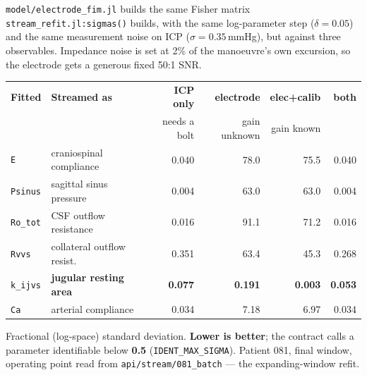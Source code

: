 \documentclass[10pt,a4paper]{article}
\begin{document}
\texttt{model/electrode\_fim.jl} builds the same Fisher matrix
\texttt{stream\_refit.jl:sigmas()} builds, with the same log-parameter step
($\delta=0.05$) and the same measurement noise on ICP ($\sigma=0.35$\,mmHg), but against
three observables. Impedance noise is set at 2\% of the manoeuvre's own excursion, so the
electrode gets a generous fixed 50:1 SNR.

\vspace{2pt}
{\footnotesize
\setlength{\tabcolsep}{5pt}
\renewcommand{\arraystretch}{1.25}
\begin{tabularx}{\linewidth}{@{}l X r r r r@{}}
\toprule
\textbf{\sffamily Fitted} & \textbf{\sffamily Streamed as} &
\textbf{\sffamily ICP only} & \textbf{\sffamily electrode} &
\textbf{\sffamily elec+calib} & \textbf{\sffamily both}\\
& & \scriptsize needs a bolt & \scriptsize gain unknown & \scriptsize gain known & \\
\midrule
\texttt{E}      & craniospinal compliance   & \cellcolor{ok!14}0.040 & \cellcolor{crit!13}78.0 & \cellcolor{crit!13}75.5 & \cellcolor{ok!14}0.040\\
\texttt{Psinus} & sagittal sinus pressure   & \cellcolor{ok!14}0.004 & \cellcolor{crit!13}63.0 & \cellcolor{crit!13}63.0 & \cellcolor{ok!14}0.004\\
\texttt{Ro\_tot}& CSF outflow resistance    & \cellcolor{ok!14}0.016 & \cellcolor{crit!13}91.1 & \cellcolor{crit!13}71.2 & \cellcolor{ok!14}0.016\\
\texttt{Rvvs}   & collateral outflow resist.& \cellcolor{ok!14}0.351 & \cellcolor{crit!13}63.4 & \cellcolor{crit!13}45.3 & \cellcolor{ok!14}0.268\\
\rowcolor{elec!7}
\texttt{k\_ijvs}& \textbf{jugular resting area} & \cellcolor{ok!14}\textbf{0.077} & \cellcolor{ok!14}\textbf{0.191} & \cellcolor{ok!30}\textbf{0.003} & \cellcolor{ok!14}\textbf{0.053}\\
\texttt{Ca}     & arterial compliance       & \cellcolor{ok!14}0.034 & \cellcolor{crit!13}7.18 & \cellcolor{crit!13}6.97 & \cellcolor{ok!14}0.034\\
\bottomrule
\end{tabularx}\par}
\vspace{2pt}
{\footnotesize\color{faint}Fractional (log-space) standard deviation. \textbf{Lower is
better}; the contract calls a parameter identifiable below \textbf{0.5}
(\texttt{IDENT\_MAX\_SIGMA}). Patient 081, final window, operating point read from
\texttt{api/stream/081\_batch} --- the expanding-window refit. \par}
\end{document}
